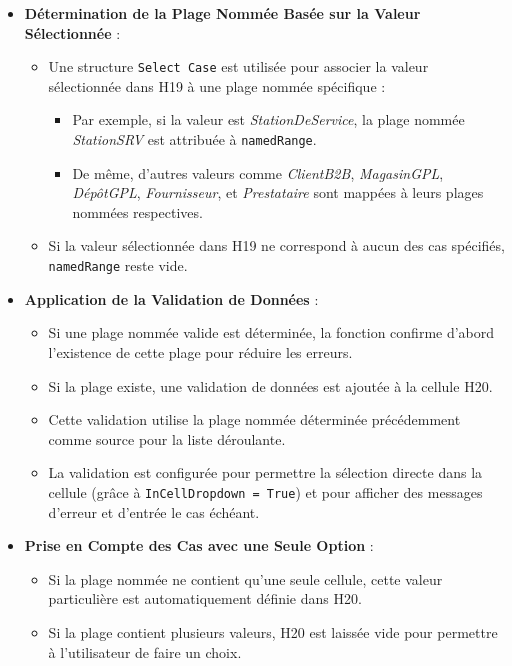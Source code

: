 \documentclass[a4paper, oneside, 12pt, final]{extreport}
\begin{document}
\begin{itemize}
    \item \textbf{Détermination de la Plage Nommée Basée sur la Valeur Sélectionnée} :
    \begin{itemize}
        \item Une structure \texttt{Select Case} est utilisée pour associer la valeur sélectionnée dans H19 à une plage nommée spécifique :
        \begin{itemize}
            \item Par exemple, si la valeur est \textit{StationDeService}, la plage nommée \textit{StationSRV} est attribuée à \texttt{namedRange}.
            \item De même, d'autres valeurs comme \textit{ClientB2B}, \textit{MagasinGPL}, \textit{DépôtGPL}, \textit{Fournisseur}, et \textit{Prestataire} sont mappées à leurs plages nommées respectives.
        \end{itemize}
        \item Si la valeur sélectionnée dans H19 ne correspond à aucun des cas spécifiés, \texttt{namedRange} reste vide.
    \end{itemize}

    \item \textbf{Application de la Validation de Données} :
    \begin{itemize}
        \item Si une plage nommée valide est déterminée, la fonction confirme d'abord l'existence de cette plage pour réduire les erreurs.
        \item Si la plage existe, une validation de données est ajoutée à la cellule H20.
        \item Cette validation utilise la plage nommée déterminée précédemment comme source pour la liste déroulante.
        \item La validation est configurée pour permettre la sélection directe dans la cellule (grâce à \texttt{InCellDropdown = True}) et pour afficher des messages d'erreur et d'entrée le cas échéant.
    \end{itemize}

    \item \textbf{Prise en Compte des Cas avec une Seule Option} :
    \begin{itemize}
        \item Si la plage nommée ne contient qu'une seule cellule, cette valeur particulière est automatiquement définie dans H20.
        \item Si la plage contient plusieurs valeurs, H20 est laissée vide pour permettre à l'utilisateur de faire un choix.
    \end{itemize}


\end{itemize}
\end{document}
